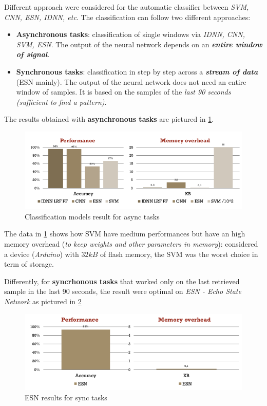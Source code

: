 \documentclass[10pt,a4paper]{report}
\theoremstyle{definition}
\begin{document}
Different approach were considered for the automatic classifier between \textit{SVM, CNN, ESN, IDNN, etc}. The classification can follow two different approaches:
\begin{itemize}
	\item 
	\textbf{Asynchronous tasks}: classification of single windows via \textit{IDNN, CNN, SVM, ESN}. The output of the neural network depends on an \textit{\textbf{entire window of signal}}.
	\item 
	\textbf{Synchronous tasks}: classification in step by step across a \textit{\textbf{stream of data}} (ESN mainly). The output of the neural network does not need an entire window of samples. It is based on the samples of the \textit{last 90 seconds (sufficient to find a pattern)}.
\end{itemize}

The results obtained with \textbf{asynchronous tasks} are pictured in \ref{models-result}.
\begin{figure}[h]
	\centering\includegraphics[scale=0.50]{images/Pasted image 20230401153946.png}
	\caption{Classification models result for async tasks}
	\label{models-result}
\end{figure}

The data in \ref{models-result} shows how SVM have medium performances but have an high memory overhead (\textit{to keep weights and other parameters in memory}): considered a device (\textit{Arduino}) with $32kB$ of flash memory, the SVM was the worst choice in term of storage.

Differently, for \textbf{syncrhonous tasks} that worked only on the last retrieved sample in the last 90 seconds, the result were optimal on \textit{ESN - Echo State Network} as pictured in \ref{ESN-result}
\begin{figure}[h]
	\centering\includegraphics[scale=0.50]{images/Pasted image 20230401154324.png}
	\caption{ESN results for sync tasks}
	\label{ESN-result}
\end{figure}
\end{document}
